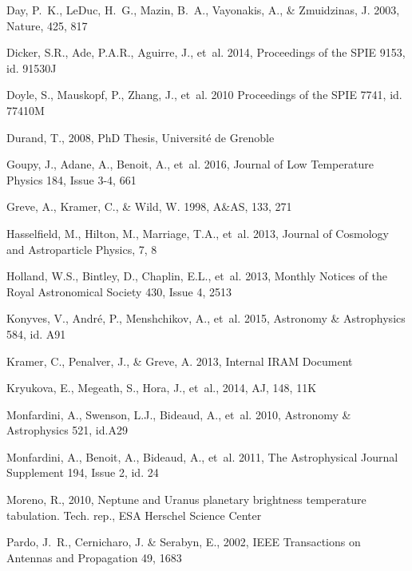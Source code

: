 \begin{thebibliography}{99}
Day, P.~K., LeDuc, H.~G., Mazin, B.~A., Vayonakis, A., \& Zmuidzinas, J. 2003,
Nature, 425, 817

Dicker, S.R., Ade, P.A.R., Aguirre, J., {et~al.} 2014,
Proceedings of the SPIE 9153, id. 91530J 

Doyle, S., Mauskopf, P., Zhang, J., {et~al.} 2010
Proceedings of the SPIE 7741, id. 77410M

Durand, T., 2008, 
PhD Thesis, Universit\' e de Grenoble

Goupy, J., Adane, A., Benoit, A., {et~al.} 2016, 
Journal of Low Temperature Physics 184, Issue 3-4, 661

Greve, A., Kramer, C., \& Wild, W. 1998, 
A\&AS, 133, 271

Hasselfield, M., Hilton, M., Marriage, T.A., {et~al.} 2013, 
Journal of Cosmology and Astroparticle Physics, 7, 8

Holland, W.S., Bintley, D., Chaplin, E.L., {et~al.} 2013, 
Monthly Notices of the Royal Astronomical Society 430, Issue 4, 2513

Konyves, V., Andr\'e, P., Menshchikov, A., {et~al.} 2015, 
Astronomy \& Astrophysics 584, id. A91

Kramer, C., Penalver, J., \& Greve, A. 2013, Internal IRAM Document

Kryukova, E., Megeath, S.,  Hora, J., {et~al.}, 2014, AJ, 148, 11K
	
Monfardini, A., Swenson, L.J., Bideaud, A., {et~al.} 2010, 
Astronomy \& Astrophysics 521, id.A29

Monfardini, A., Benoit, A., Bideaud, A., {et~al.} 2011, 
The Astrophysical Journal Supplement 194, Issue 2, id. 24
 
Moreno, R., 2010, 
Neptune and Uranus planetary brightness temperature tabulation. Tech. rep., ESA Herschel Science Center

Pardo, J.~R., Cernicharo, J. \& Serabyn, E., 2002, 
IEEE Transactions on Antennas and Propagation 49, 1683
    

\end{thebibliography}
